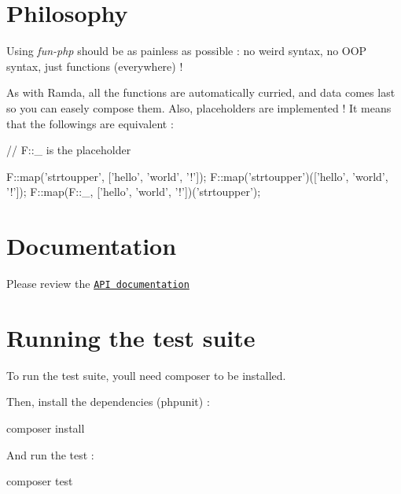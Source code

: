 \section*{Philosophy}

Using {\itshape fun-\/php} should be as painless as possible \+: no weird syntax, no O\+OP syntax, just functions (everywhere) !

As with Ramda, all the functions are automatically curried, and data comes last so you can easely compose them. Also, placeholders are implemented ! It means that the followings are equivalent \+:


\begin{DoxyCode}
\textcolor{comment}{// F::\_ is the placeholder}

F::map(\textcolor{stringliteral}{'strtoupper'}, [\textcolor{stringliteral}{'hello'}, \textcolor{stringliteral}{'world'}, \textcolor{charliteral}{'!'}]);
F::map(\textcolor{stringliteral}{'strtoupper'})([\textcolor{stringliteral}{'hello'}, \textcolor{stringliteral}{'world'}, \textcolor{charliteral}{'!'}]);
F::map(F::\_, [\textcolor{stringliteral}{'hello'}, \textcolor{stringliteral}{'world'}, \textcolor{charliteral}{'!'}])(\textcolor{stringliteral}{'strtoupper'});
\end{DoxyCode}


\section*{Documentation}

Please review the \href{/classboehm__s_1_1F.html#a1712c41e5be41e6f6e2088ed5d54a864}{\tt A\+PI documentation}

\section*{Running the test suite}

To run the test suite, you\textquotesingle{}ll need {\ttfamily composer} to be installed.

Then, install the dependencies (phpunit) \+:


\begin{DoxyCode}
composer install
\end{DoxyCode}


And run the test \+:


\begin{DoxyCode}
composer test
\end{DoxyCode}
 